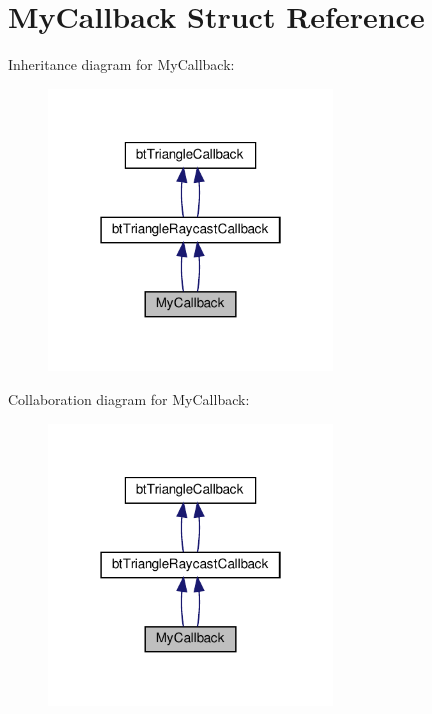 \hypertarget{structMyCallback}{}\section{My\+Callback Struct Reference}
\label{structMyCallback}


Inheritance diagram for My\+Callback\+:
\nopagebreak
\begin{figure}[H]
\begin{center}
\leavevmode
\includegraphics[width=214pt]{structMyCallback__inherit__graph}
\end{center}
\end{figure}


Collaboration diagram for My\+Callback\+:
\nopagebreak
\begin{figure}[H]
\begin{center}
\leavevmode
\includegraphics[width=214pt]{structMyCallback__coll__graph}
\end{center}
\end{figure}
